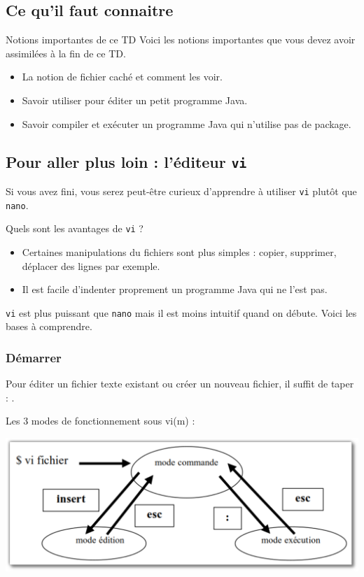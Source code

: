 \documentclass[a4paper,11pt]{style-esi/td}
\begin{document}
	\subsection{Ce qu'il faut connaitre}

		\begin{theorie}{Notions importantes de ce TD}
			Voici les notions importantes que vous devez avoir assimilées à la fin de ce TD.
			\begin{itemize}
			\item 
				La notion de fichier caché et comment les voir.
			\item 
				Savoir utiliser  pour éditer un petit programme Java.
			\item 
				Savoir compiler et exécuter un programme Java 
				qui n'utilise pas de package.
			\end{itemize}
		\end{theorie}

	\subsection{Pour aller plus loin : l'éditeur \texttt{vi}}

		Si vous avez fini,
		vous serez peut-être curieux d'apprendre à utiliser \texttt{vi}
		plutôt que \texttt{nano}.

		Quels sont les avantages de \texttt{vi} ?
		\begin{itemize}
		\item 
			Certaines manipulations du fichiers sont plus simples : 
			copier, supprimer, déplacer des lignes par exemple.
		\item 
			Il est facile d'indenter proprement un programme Java qui ne l'est pas.
		\end{itemize}

		\texttt{vi} est plus puissant que \texttt{nano}
		mais il est moins intuitif quand on débute.
		Voici les bases à comprendre.

		\subsubsection*{Démarrer}

			Pour éditer un fichier texte existant
			ou créer un nouveau fichier, 
			il suffit de taper : .

			Les 3 modes de fonctionnement sous vi(m) :
			\begin{center}
			\includegraphics[width=.7\textwidth]{image/vi.pdf}
			\end{center}
\end{document}
